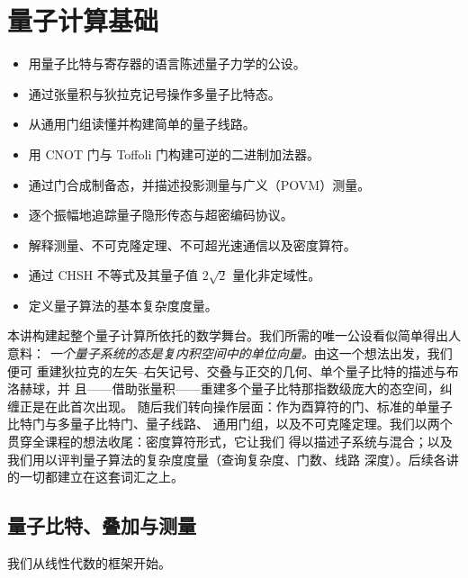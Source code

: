 \chapter{量子计算基础}
\label{ch:lec01}

\begin{objectives}
\begin{itemize}[leftmargin=1.4em,nosep]
  \item 用量子比特与寄存器的语言陈述量子力学的公设。
  \item 通过张量积与狄拉克记号操作多量子比特态。
  \item 从通用门组读懂并构建简单的量子线路。
  \item 用 CNOT 门与 Toffoli 门构建可逆的二进制加法器。
  \item 通过门合成制备态，并描述投影测量与广义（POVM）测量。
  \item 逐个振幅地追踪量子隐形传态与超密编码协议。
  \item 解释测量、不可克隆定理、不可超光速通信以及密度算符。
  \item 通过 CHSH 不等式及其量子值 $2\sqrt2$ 量化非定域性。
  \item 定义量子算法的基本复杂度度量。
\end{itemize}
\end{objectives}


本讲构建起整个量子计算所依托的数学舞台。我们所需的唯一公设看似简单得出人意料：
\emph{一个量子系统的态是复内积空间中的单位向量。}由这一个想法出发，我们便可
重建狄拉克的左矢--右矢记号、交叠与正交的几何、单个量子比特的描述与布洛赫球，并
且——借助张量积——重建多个量子比特那指数级庞大的态空间，纠缠正是在此首次出现。
随后我们转向操作层面：作为酉算符的门、标准的单量子比特门与多量子比特门、量子线路、
通用门组，以及不可克隆定理。我们以两个贯穿全课程的想法收尾：密度算符形式，它让我们
得以描述子系统与混合；以及我们用以评判量子算法的复杂度度量（查询复杂度、门数、线路
深度）。后续各讲的一切都建立在这套词汇之上。

\section{量子比特、叠加与测量}
\label{sec:lec01-1}

我们从线性代数的框架开始。

